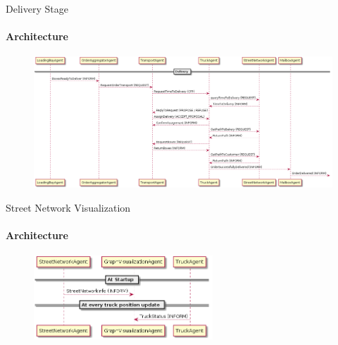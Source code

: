 \documentclass[9pt, aspectratio=169]{beamer}
\begin{document}
\begin{frame}{Delivery Stage}
\framesubtitle{Architecture}
\begin{figure}[h!]
	\centering
	\includegraphics[width=\textwidth]{../Architecture/Architecture_Delivery.png}
\end{figure}
\end{frame}

\begin{frame}{Street Network Visualization}
\framesubtitle{Architecture}
\begin{figure}[h!]
	\centering
	\includegraphics[width=0.6\textwidth]{../Architecture/Architecture_Visualization.png}
\end{figure}
\end{frame}
\end{document}
